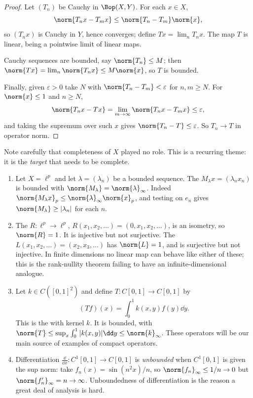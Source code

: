 \begin{proof}
	Let $(T_n)$ be Cauchy in $\Bop(X,Y)$. For each $x \in X$,
	$$\norm{T_n x - T_m x} \leq \norm{T_n - T_m}\norm{x},$$
	so $(T_n x)$ is Cauchy in $Y$, hence converges; define $Tx = \lim_n T_n x$. The map $T$ is linear, being a pointwise limit of linear maps.

	Cauchy sequences are bounded, say $\norm{T_n} \leq M$; then $\norm{Tx} = \lim_n \norm{T_n x} \leq M \norm{x}$, so $T$ is bounded.

	Finally, given $\varepsilon > 0$ take $N$ with $\norm{T_n - T_m} < \varepsilon$ for $n, m \geq N$. For $\norm{x} \leq 1$ and $n \geq N$,
	$$\norm{T_n x - Tx} = \lim_{m \to \infty} \norm{T_n x - T_m x} \leq \varepsilon,$$
	and taking the supremum over such $x$ gives $\norm{T_n - T} \leq \varepsilon$. So $T_n \to T$ in operator norm.
\end{proof}

Note carefully that completeness of $X$ played no role. This is a recurring theme: it is the \emph{target} that needs to be complete.

\begin{example}
	\begin{enumerate}[label=(\roman*)]
		\item Let $X = \ell^p$ and let $\lambda = (\lambda_n)$ be a bounded sequence. The  $M_\lambda x = (\lambda_n x_n)$ is bounded with $\norm{M_\lambda} = \norm{\lambda}_\infty$. Indeed $\norm{M_\lambda x}_p \leq \norm{\lambda}_\infty \norm{x}_p$, and testing on $e_n$ gives $\norm{M_\lambda} \geq |\lambda_n|$ for each $n$.
		\item The  $R : \ell^p \to \ell^p$, $R(x_1, x_2, \dots) = (0, x_1, x_2, \dots)$, is an isometry, so $\norm{R} = 1$. It is injective but not surjective. The  $L(x_1, x_2, \dots) = (x_2, x_3, \dots)$ has $\norm{L} = 1$, and is surjective but not injective. In finite dimensions no linear map can behave like either of these; this is the rank-nullity theorem failing to have an infinite-dimensional analogue.
		\item Let $k \in C([0,1]^2)$ and define $T : C[0,1] \to C[0,1]$ by
		$$(Tf)(x) = \int_0^1 k(x,y) f(y) \dd y.$$
		This is the  with kernel $k$. It is bounded, with $\norm{T} \leq \sup_{x} \int_0^1 |k(x,y)| \dd y \leq \norm{k}_\infty$. These operators will be our main source of examples of compact operators.
		\item Differentiation $\frac{\dd}{\dd x} : C^1[0,1] \to C[0,1]$ is \emph{unbounded} when $C^1[0,1]$ is given the sup norm: take $f_n(x) = \sin(n^2x)/n$, so $\norm{f_n}_\infty \leq 1/n \to 0$ but $\norm{f_n'}_\infty = n \to \infty$. Unboundedness of differentiation is the reason a great deal of analysis is hard.
	\end{enumerate}
\end{example}

